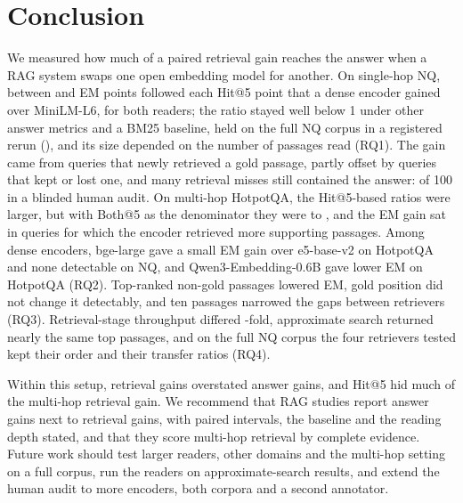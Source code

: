 \section{Conclusion}\label{sec:conclusion}

We measured how much of a paired retrieval gain reaches the answer when a RAG system swaps one open embedding model for another. On single-hop NQ, between  and  EM points followed each Hit@5 point that a dense encoder gained over MiniLM-L6, for both readers; the ratio stayed well below 1 under other answer metrics and a BM25 baseline, held on the full NQ corpus in a registered rerun (), and its size depended on the number of passages read (RQ1). The gain came from queries that newly retrieved a gold passage, partly offset by queries that kept or lost one, and many retrieval misses still contained the answer:  of 100 in a blinded human audit. On multi-hop HotpotQA, the Hit@5-based ratios were larger, but with Both@5 as the denominator they were  to , and the EM gain sat in queries for which the encoder retrieved more supporting passages. Among dense encoders, bge-large gave a small EM gain over e5-base-v2 on HotpotQA and none detectable on NQ, and Qwen3-Embedding-0.6B gave lower EM on HotpotQA (RQ2). Top-ranked non-gold passages lowered EM, gold position did not change it detectably, and ten passages narrowed the gaps between retrievers (RQ3). Retrieval-stage throughput differed -fold, approximate search returned nearly the same top passages, and on the full NQ corpus the four retrievers tested kept their order and their transfer ratios (RQ4).

Within this setup, retrieval gains overstated answer gains, and Hit@5 hid much of the multi-hop retrieval gain. We recommend that RAG studies report answer gains next to retrieval gains, with paired intervals, the baseline and the reading depth stated, and that they score multi-hop retrieval by complete evidence. Future work should test larger readers, other domains and the multi-hop setting on a full corpus, run the readers on approximate-search results, and extend the human audit to more encoders, both corpora and a second annotator.
